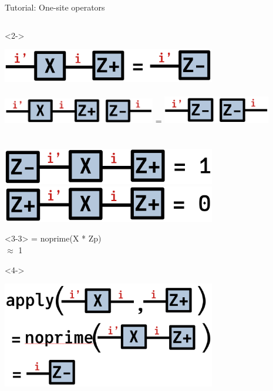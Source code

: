 \begin{frame}[fragile]{Tutorial: One-site operators}
\begin{columns}
\begin{column}{4.5cm}
\begin{onlyenv}<2->
\vspace*{-0.2cm}
\begin{center}
\includegraphics[width=0.7\textwidth]{
  slides/assets/XZp.png
} \\
~\\
\includegraphics[width=0.5\textwidth]{
  slides/assets/outer_XZp_Zm.png
}
=
\includegraphics[width=0.35\textwidth]{
  slides/assets/outer_Zm_Zm.png
} \\
~\\
~\\
\includegraphics[width=0.7\textwidth]{
  slides/assets/ZmXZp.png
} \\
\includegraphics[width=0.7\textwidth]{
  slides/assets/ZpXZp.png
}
\end{center}
\vspace*{0.0cm}
\end{onlyenv}

\begin{onlyenv}<3-3>
= noprime(X * Zp) \\
$\approx$ 1 \\
\end{onlyenv}

\begin{onlyenv}<4->
\vspace*{0.0cm}
\begin{center}
\includegraphics[width=0.7\textwidth]{
  slides/assets/apply_XZp.png
}
\end{center}
\vspace*{0.0cm}
\end{onlyenv}


\end{column}
\end{columns}
\end{frame}
